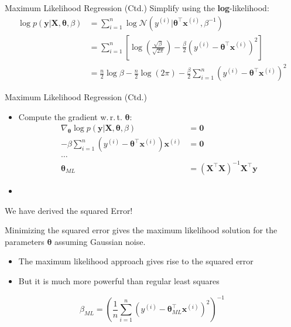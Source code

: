 \begin{frame}{Maximum Likelihood Regression (Ctd.)}{}
	Simplify using the \textbf{log}-likelihood:
	\begin{align}
		\log p(\bm{y} \vert \bm{X}, \bm{\theta}, \beta)
			&= \sum_{i=1}^n \log\mathcal{N}(y^{(i)} \vert \bm{\theta}^{\intercal}\bm{x}^{(i)}, \beta^{-1}) \\
			&= \sum_{i=1}^n \left[ \log\left( \frac{\sqrt{\beta}}{\sqrt{2\pi}} \right) - 
				\frac{\beta}{2}(y^{(i)} - \bm{\theta}^{\intercal}\bm{x}^{(i)})^2 \right] \\
			&= \frac{n}{2} \log\beta - \frac{n}{2}\log(2\pi) - \frac{\beta}{2}\sum_{i=1}^n(y^{(i)} -
				\bm{\theta}^{\intercal}\bm{x}^{(i)})^2
	\end{align}
\end{frame}


\begin{frame}{Maximum Likelihood Regression (Ctd.)}{}
	\begin{itemize}
		\item Compute the gradient w.\,r.\,t. $\bm{\theta}$:
		\begin{align*}
			\nabla_{\bm{\theta}} \log p(\bm{y} \vert \bm{X}, \bm{\theta}, \beta) &= \bm{0} \\
			-\beta \sum_{i=1}^n (y^{(i)} - \bm{\theta}^{\intercal} \bm{x}^{(i)})\bm{x}^{(i)} &= \bm{0} \\
			\dots \\
			\bm{\theta}_{ML} &= (\bm{X}^{\intercal}\bm{X})^{-1} \bm{X}^{\intercal} \bm{y}
		\end{align*}
		\item {}
	\end{itemize}
\end{frame}


\begin{frame}{We have derived the squared Error!}{}\important
	\begin{boxBlue}
		Minimizing the squared error gives the maximum likelihood solution for the parameters $\bm{\theta}$ assuming
		Gaussian noise.
	\end{boxBlue}
	\begin{itemize}
		\item The maximum likelihood approach gives rise to the squared error
		\item But it is much more powerful than regular least squares
	\end{itemize}
	\begin{equation}
		\beta_{ML} = \left( \frac{1}{n} \sum_{i=1}^n
			(y^{(i)} - \bm{\theta}_{ML}^{\intercal} \bm{x}^{(i)})^2 \right)^{-1}
	\end{equation}
\end{frame}


